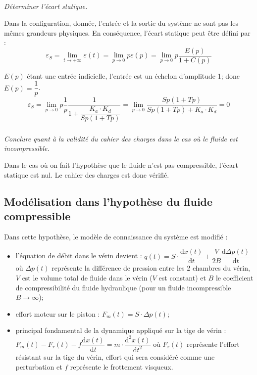 \documentclass[10pt,fleqn]{article} %
\begin{document}
\begin{multicols}{2}
\subparagraph{}
\textit{Déterminer l'écart statique.}
\ifprof
\begin{corrige}
Dans la configuration, donnée, l'entrée et la sortie du système ne sont pas les mêmes grandeurs physiques. En conséquence, l'écart statique peut être défini par : 
$$
\varepsilon_S 
= \lim\limits_{t\to+\infty} \varepsilon(t)
= \lim\limits_{p\to 0} p\varepsilon(p)
= \lim\limits_{p\to 0} p\dfrac{E(p)}{1+C(p)}
$$

$E(p)$ étant une entrée indicielle, l'entrée est un échelon d'amplitude 1; donc $E(p)=\dfrac{1}{p}$.
$$
\varepsilon_S 
= \lim\limits_{p\to 0} p\dfrac{1}{p}\dfrac{1}{1+\dfrac{K_a\cdot K_d }{Sp\left( 1+Tp\right)}}
= \lim\limits_{p\to 0} \dfrac{Sp\left( 1+Tp\right)}{Sp\left( 1+Tp\right)+K_a\cdot K_d}
= 0
$$
\end{corrige}
\else \fi

\subparagraph{}
\textit{Conclure quant à la validité du cahier des charges dans le cas où le fluide est incompressible.}
\ifprof
\begin{corrige}
Dans le cas où on fait l'hypothèse que le fluide n'est pas compressible, l'écart statique est nul. Le cahier des charges est donc vérifié.
\end{corrige}
\else \fi


\subsection*{Modélisation dans l'hypothèse du fluide compressible}
Dans cette hypothèse, le modèle de connaissance du système est modifié : 
\begin{itemize}
\item l'équation de débit dans le vérin devient : $q(t)=S\cdot\dfrac{\text{d}x(t)}{\text{d}t}+\dfrac{V}{2B}\dfrac{\text{d}\Delta p(t)}{\text{d}t}$ où $\Delta p(t)$ représente la différence de pression entre les 2 chambres du vérin, $V$ est le volume total de fluide dans le vérin ($V$ est constant) et $B$ le coefficient de compressibilité du fluide hydraulique (pour un fluide incompressible $B\rightarrow \infty$);
\item effort moteur sur le piston : $F_m(t)=S\cdot \Delta p(t)$;
\item principal fondamental de la dynamique appliqué sur la tige de vérin :
$F_m(t)-F_r(t)-f\dfrac{\text{d}x(t)}{\text{d}t}=m\cdot\dfrac{\text{d}^2x(t)}{\text{d}t^2}$ où $F_r(t)$ représente l'effort résistant sur la tige du vérin, effort qui sera considéré comme une perturbation et $f$ représente le frottement visqueux.
\end{itemize}


\end{multicols}
\end{document}
